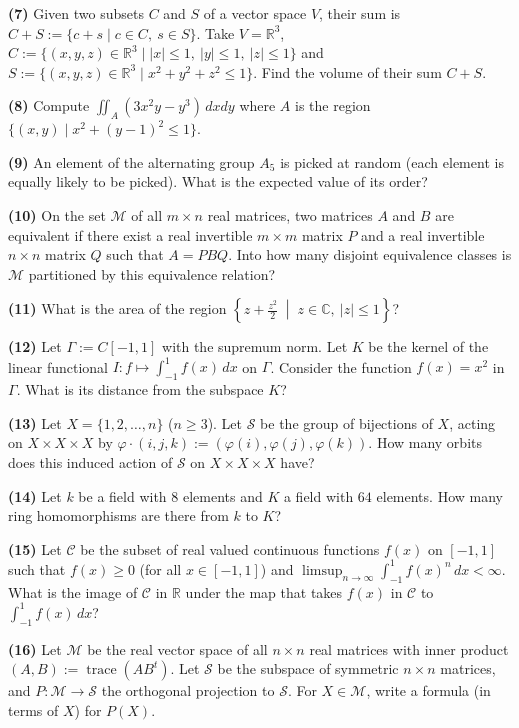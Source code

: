\documentclass[11pt,a4paper]{article}
\newcommand{\R}{\mathbb{R}}
\newcommand{\C}{\mathbb{C}}
\newcommand{\qitem}[1]{\par\medskip\noindent\textbf{#1}\hspace{0.5em}}
\begin{document}
\qitem{(7)} Given two subsets $C$ and $S$ of a vector space $V$, their sum is $C + S := \{c + s \mid c \in C,\ s \in S\}$. Take $V = \R^3$, $C := \{(x, y, z) \in \R^3 \mid |x| \le 1,\ |y| \le 1,\ |z| \le 1\}$ and $S := \{(x, y, z) \in \R^3 \mid x^2 + y^2 + z^2 \le 1\}$. Find the volume of their sum $C + S$.

\qitem{(8)} Compute $\displaystyle\iint_A (3x^2 y - y^3)\,dxdy$ where $A$ is the region $\{(x, y) \mid x^2 + (y - 1)^2 \le 1\}$.

\qitem{(9)} An element of the alternating group $A_5$ is picked at random (each element is equally likely to be picked). What is the expected value of its order?

\qitem{(10)} On the set $\mathcal{M}$ of all $m \times n$ real matrices, two matrices $A$ and $B$ are equivalent if there exist a real invertible $m \times m$ matrix $P$ and a real invertible $n \times n$ matrix $Q$ such that $A = PBQ$. Into how many disjoint equivalence classes is $\mathcal{M}$ partitioned by this equivalence relation?

\qitem{(11)} What is the area of the region $\left\{z + \frac{z^2}{2} \;\middle|\; z \in \C,\ |z| \le 1\right\}$?

\qitem{(12)} Let $\Gamma := C[-1, 1]$ with the supremum norm. Let $K$ be the kernel of the linear functional $I : f \mapsto \int_{-1}^{1} f(x)\,dx$ on $\Gamma$. Consider the function $f(x) = x^2$ in $\Gamma$. What is its distance from the subspace $K$?

\qitem{(13)} Let $X = \{1, 2, \dots, n\}$ ($n \ge 3$). Let $\mathcal{S}$ be the group of bijections of $X$, acting on $X \times X \times X$ by $\varphi\cdot(i, j, k) := (\varphi(i), \varphi(j), \varphi(k))$. How many orbits does this induced action of $\mathcal{S}$ on $X \times X \times X$ have?

\qitem{(14)} Let $k$ be a field with $8$ elements and $K$ a field with $64$ elements. How many ring homomorphisms are there from $k$ to $K$?

\qitem{(15)} Let $\mathcal{C}$ be the subset of real valued continuous functions $f(x)$ on $[-1, 1]$ such that $f(x) \ge 0$ (for all $x \in [-1, 1]$) and $\limsup_{n \to \infty} \int_{-1}^{1} f(x)^n\,dx < \infty$. What is the image of $\mathcal{C}$ in $\R$ under the map that takes $f(x)$ in $\mathcal{C}$ to $\int_{-1}^{1} f(x)\,dx$?

\qitem{(16)} Let $\mathcal{M}$ be the real vector space of all $n \times n$ real matrices with inner product $(A, B) := \operatorname{trace}(AB^t)$. Let $\mathcal{S}$ be the subspace of symmetric $n \times n$ matrices, and $P : \mathcal{M} \to \mathcal{S}$ the orthogonal projection to $\mathcal{S}$. For $X \in \mathcal{M}$, write a formula (in terms of $X$) for $P(X)$.
\end{document}

